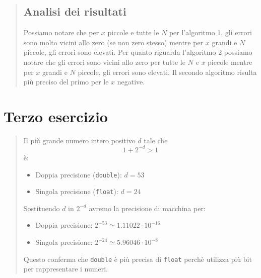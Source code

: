 \documentclass[10pt]{article}
\begin{document}
\begin{quote}
    \subsection{Analisi dei risultati}
    Possiamo notare che per $x$ piccole e tutte le $N$ per l'algoritmo 1, gli errori sono molto vicini allo zero (se non zero stesso) mentre per $x$ grandi e $N$ piccole, gli errori sono elevati. Per quanto riguarda l'algoritmo 2 possiamo notare che gli errori sono vicini allo zero per tutte le $N$ e $x$ piccole mentre per $x$ grandi e $N$ piccole, gli errori sono elevati. Il secondo algoritmo risulta più preciso del primo per le $x$ negative.
\end{quote}
\newpage
\section{Terzo esercizio}
\begin{quote}
    Il più grande numero intero positivo $d$ tale che \begin{equation*}
        1+2^{-d} > 1
    \end{equation*}
    è:
    \begin{itemize}
        \item Doppia precisione (\texttt{double}): $d=53$
        \item Singola precisione (\texttt{float}): $d=24$
    \end{itemize}
    Sostituendo $d$ in $2^{-d}$ avremo la precisione di macchina per:
    \begin{itemize}
        \item Doppia precisione: $2^{-53}\simeq 1.11022\cdot 10^{-16}$
        \item Singola precisione: $2^{-24}\simeq 5.96046\cdot 10^{-8}$
    \end{itemize}
    Questo conferma che \texttt{double} è più precisa di \texttt{float} perchè utilizza più bit per rappresentare i numeri.
\end{quote}
\end{document}
